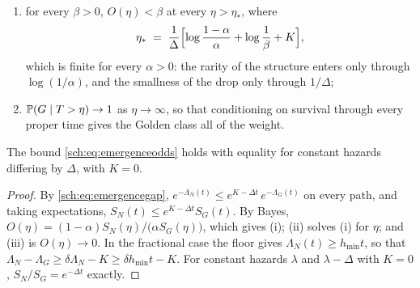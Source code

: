 \begin{theorem}
\begin{enumerate}[label=\emph{(\roman*)},itemsep=2pt]
survival to $\eta$, satisfy
\begin{equation}\label{sch:eq:emergenceodds}
O(\eta)\;:=\;\frac{\PP(N\mid T>\eta)}{\PP(G\mid T>\eta)}
\;\le\;\frac{1-\alpha}{\alpha}\,e^{K-\Delta\eta};
\end{equation}
\item for every $\beta>0$, $O(\eta)<\beta$ at every $\eta>\eta_\ast$,
where
\begin{equation}\label{sch:eq:emergencehorizon}
\eta_\ast\;=\;\frac{1}{\Delta}\Bigl[\log\frac{1-\alpha}{\alpha}
+\log\frac{1}{\beta}+K\Bigr],
\end{equation}
which is finite for every $\alpha>0$: the rarity of the structure enters
only through $\log(1/\alpha)$, and the smallness of the drop only
through $1/\Delta$;
\item $\mathbb{P}(G\mid T>\eta)\to1$ as $\eta\to\infty$, so that conditioning
on survival through every proper time gives the Golden class all of the
weight.
\end{enumerate}
The bound \eqref{sch:eq:emergenceodds} holds with equality for constant
hazards differing by $\Delta$, with $K=0$.
\end{theorem}

\begin{proof}
By \eqref{sch:eq:emergencegap},
$e^{-\Lambda_N(t)}\le e^{K-\Delta t}\,e^{-\Lambda_G(t)}$ on every path,
and taking expectations, $S_N(t)\le e^{K-\Delta t}S_G(t)$. By Bayes,
$O(\eta)=(1-\alpha)S_N(\eta)/\bigl(\alpha S_G(\eta)\bigr)$, which gives
(i); (ii) solves (i) for $\eta$; and (iii) is $O(\eta)\to0$. In the
fractional case the floor gives $\Lambda_N(t)\ge h_{\min}t$, so that
$\Lambda_N-\Lambda_G\ge\delta\Lambda_N-K\ge\delta h_{\min}t-K$. For
constant hazards $\lambda$ and $\lambda-\Delta$ with $K=0$,
$S_N/S_G=e^{-\Delta t}$ exactly.
\end{proof}


